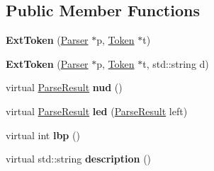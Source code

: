\subsection*{Public Member Functions}
\begin{DoxyCompactItemize}
\item 
\hypertarget{class_ext_token_a45a27528f391faf5679b7b30563ce846}{}{\bfseries Ext\+Token} (\hyperlink{class_parser}{Parser} $\ast$p, \hyperlink{class_token}{Token} $\ast$t)\label{class_ext_token_a45a27528f391faf5679b7b30563ce846}

\item 
\hypertarget{class_ext_token_afa8972152abec42cd52b6f6f70a9a179}{}{\bfseries Ext\+Token} (\hyperlink{class_parser}{Parser} $\ast$p, \hyperlink{class_token}{Token} $\ast$t, std\+::string d)\label{class_ext_token_afa8972152abec42cd52b6f6f70a9a179}

\item 
\hypertarget{class_ext_token_a5c21a5ffe91f212085259126652ab77c}{}virtual \hyperlink{class_parse_result}{Parse\+Result} {\bfseries nud} ()\label{class_ext_token_a5c21a5ffe91f212085259126652ab77c}

\item 
\hypertarget{class_ext_token_afb2c9b0040e198d1d8aa2e041c5a7211}{}virtual \hyperlink{class_parse_result}{Parse\+Result} {\bfseries led} (\hyperlink{class_parse_result}{Parse\+Result} left)\label{class_ext_token_afb2c9b0040e198d1d8aa2e041c5a7211}

\item 
\hypertarget{class_ext_token_a6c0d61faa058b71147dd54bacee1db94}{}virtual int {\bfseries lbp} ()\label{class_ext_token_a6c0d61faa058b71147dd54bacee1db94}

\item 
\hypertarget{class_ext_token_a4ab6e72ac23235650b1756f794172ebb}{}virtual std\+::string {\bfseries description} ()\label{class_ext_token_a4ab6e72ac23235650b1756f794172ebb}

\end{DoxyCompactItemize}

